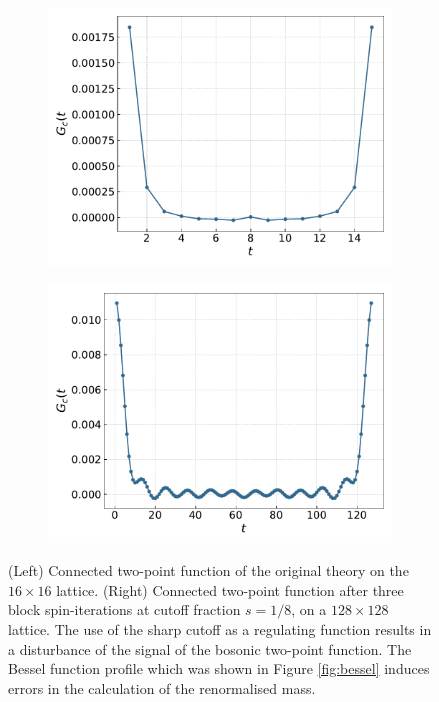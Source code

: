\begin{figure}
    \centering 
    \begin{subfigure}{0.47\textwidth}
        \includegraphics[width=\textwidth]{figures/conn2ptf16.pdf}
    \end{subfigure}
    \begin{subfigure}{0.47\textwidth}
        \includegraphics[width=\textwidth]{figures/conn2ptf128.pdf}
    \end{subfigure}
    \caption[Effect of the sharp cutoff on the connected two-point function]{(Left) Connected two-point function of the original theory on the $16 \times 16$ lattice. (Right) Connected two-point function after three block spin-iterations at cutoff fraction $s=1/8$, on a $128 \times 128$ lattice. The use of the sharp cutoff as a regulating function results in a disturbance of the signal of the bosonic two-point function. The Bessel function profile which was shown in Figure \ref{fig:bessel} induces errors in the calculation of the renormalised mass.}
    \label{fig:connected_2ptf}
\end{figure} \\
